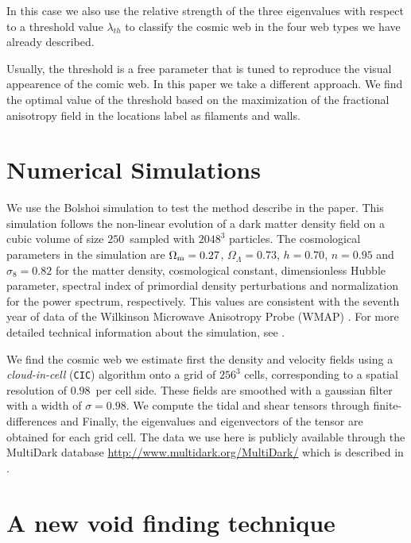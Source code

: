 \documentclass[a4,useAMS,usenatbib,usegraphicx]{latex/mn2e}
\begin{document}
In this case we also use the relative strength of the three eigenvalues with 
respect to a threshold value $\lambda_{th}$ to classify the cosmic web
in the four web types we have already described.

Usually, the threshold is a free parameter that is tuned to reproduce
the visual appearence of the comic web. 
In this paper we take a different approach.
We find the optimal value of the threshold based on the maximization
of the fractional anisotropy field in the locations label as filaments
and walls. 


\section{Numerical Simulations}
\label{sec:simulations}

We use the Bolshoi simulation to test the method describe in the
paper. 
This simulation follows the non-linear evolution of a dark
matter density field on a cubic volume of  size $250$\hMpc\ sampled
with $2048^3$ particles. 
The cosmological parameters in the simulation are $\Omega_{\rm m}=0.27$,  $\Omega_{\Lambda}  =0.73$, $h=0.70$,
$n=0.95$ and $\sigma_{8}=0.82$ for the matter density,   cosmological
constant, dimensionless Hubble parameter, spectral index of
primordial density perturbations and normalization for the power
spectrum, respectively. 
This values are consistent with the seventh year of data of the Wilkinson 
Microwave Anisotropy Probe (WMAP) \citep{Jarosik11}. 
For more detailed  technical information about the simulation, see
\citet{Klypin11}. 


We find the cosmic web we estimate first the density and velocity
fields using a  \textit{cloud-in-cell} (\texttt{CIC}) algorithm onto a grid of $256^3$ 
cells, corresponding to a spatial resolution of $0.98$\hMpc\ per cell
side.  
These fields are smoothed with a gaussian filter with a width of
$\sigma=0.98$\hMpc.
We compute the tidal and shear tensors through finite-differences and
Finally, the eigenvalues and eigenvectors of the tensor are
obtained for each grid cell.
The data we use here is publicly available through the MultiDark
database \url{http://www.multidark.org/MultiDark/} which is described
in \citet{Riebe11}.



\section{A new void finding technique}
\label{sec:bulk_voids}
\end{document}
